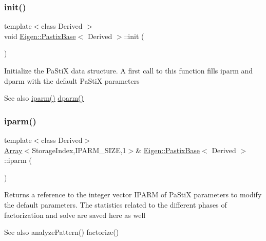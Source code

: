 \subsubsection{\texorpdfstring{init()}{init()}}
{\footnotesize\ttfamily template$<$class Derived $>$ \\
void \mbox{\hyperlink{class_eigen_1_1_pastix_base}{Eigen\+::\+Pastix\+Base}}$<$ Derived $>$\+::init (\begin{DoxyParamCaption}{ }\end{DoxyParamCaption})\hspace{0.3cm}{\ttfamily [protected]}}

Initialize the Pa\+StiX data structure. A first call to this function fills iparm and dparm with the default Pa\+StiX parameters \begin{DoxySeeAlso}{See also}
\mbox{\hyperlink{class_eigen_1_1_pastix_base_a38378e7b2b5c750a8a23e2c21a69146c}{iparm()}} \mbox{\hyperlink{class_eigen_1_1_pastix_base_af4a29373aa3e6a980738efde33f92a76}{dparm()}} 
\end{DoxySeeAlso}
\mbox{\label{class_eigen_1_1_pastix_base_a38378e7b2b5c750a8a23e2c21a69146c}} 
\subsubsection{\texorpdfstring{iparm()}{iparm()}\hspace{0.1cm}{\footnotesize\ttfamily [1/2]}}
{\footnotesize\ttfamily template$<$class Derived$>$ \\
\mbox{\hyperlink{class_eigen_1_1_array}{Array}}$<$Storage\+Index,I\+P\+A\+R\+M\+\_\+\+S\+I\+ZE,1$>$\& \mbox{\hyperlink{class_eigen_1_1_pastix_base}{Eigen\+::\+Pastix\+Base}}$<$ Derived $>$\+::iparm (\begin{DoxyParamCaption}{ }\end{DoxyParamCaption})\hspace{0.3cm}{\ttfamily [inline]}}

Returns a reference to the integer vector I\+P\+A\+RM of Pa\+StiX parameters to modify the default parameters. The statistics related to the different phases of factorization and solve are saved here as well \begin{DoxySeeAlso}{See also}
analyze\+Pattern() factorize() 
\end{DoxySeeAlso}
\mbox{\label{class_eigen_1_1_pastix_base_a5509ca8d6a9217fb95ab020363b9e0fb}} 
